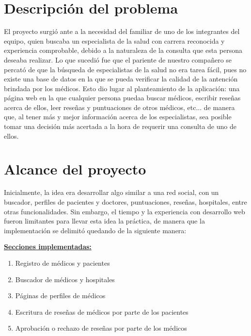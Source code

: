 \pagebreak

\tableofcontents

\pagebreak

\section{Descripción del problema}

El proyecto surgió ante a la necesidad del familiar de uno de los integrantes del equipo, quien buscaba un especialista de la salud con carrera reconocida y experiencia comprobable, debido a la naturaleza de la consulta que esta persona deseaba realizar. Lo que sucedió fue que el pariente de nuestro compañero se percató de que la búsqueda de especialistas de la salud no era tarea fácil, pues no existe una base de datos en la que se pueda verificar la calidad de la antención brindada por los médicos. Esto dio lugar al planteamiento de la aplicación: una página web en la que cualquier persona puedaa buscar médicos, escribir reseñas acerca de ellos, leer reseñas y puntuaciones de otros médicos, etc... de manera que, al tener más y mejor información acerca de los especialistas, sea posible tomar una decisión más acertada a la hora de requerir una consulta de uno de ellos.

\section{Alcance del proyecto}

Inicialmente, la idea era desarrollar algo similar a una red social, con un buscador, perfiles de pacientes y doctores, puntuaciones, reseñas, hospitales, entre otras funcionalidades. Sin embargo, el tiempo y la experiencia con desarrollo web fueron limitantes para llevar esta idea la práctica, de manera que la implementación se delimitó quedando de la siguiente manera:

\vspace{0.3 cm}

\textbf{\underline{Secciones implementadas:}}

\begin{enumerate}
\item Registro de médicos y pacientes
\item Buscador de médicos y hospitales
\item Páginas de perfiles de médicos
\item Escritura de reseñas de médicos por parte de los pacientes
\item Aprobación o rechazo de reseñas por parte de los médicos
\end{enumerate}

